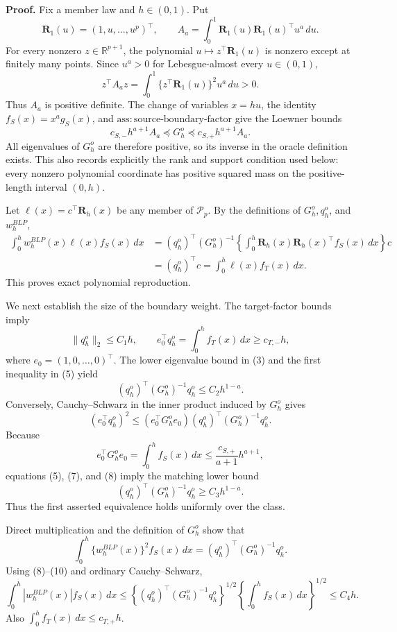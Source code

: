 \textbf{Proof.}
Fix a member law and \(h\in(0,1)\).  Put
\[
\mathbf R_1(u)=(1,u,\ldots,u^p)^\top,
\qquad
A_a=\int_0^1\mathbf R_1(u)\mathbf R_1(u)^\top u^a\,du.
\tag{1}
\]
For every nonzero \(z\in\mathbb R^{p+1}\), the polynomial
\(u\mapsto z^\top\mathbf R_1(u)\) is nonzero except at finitely many points.  Since
\(u^a>0\) for Lebesgue-almost every \(u\in(0,1)\),
\[
z^\top A_a z=\int_0^1\{z^\top\mathbf R_1(u)\}^2u^a\,du>0.
\tag{2}
\]
Thus \(A_a\) is positive definite.  The change of variables \(x=hu\), the identity
\(f_S(x)=x^ag_S(x)\), and \(\mathrm{ass:source\text{-}boundary\text{-}factor}\) give the Loewner bounds
\[
c_{S,-}h^{a+1}A_a
\preceq G_h^o
\preceq c_{S,+}h^{a+1}A_a.
\tag{3}
\]
All eigenvalues of \(G_h^o\) are therefore positive, so its inverse in the oracle definition exists.  This also records explicitly the rank and support condition used below: every nonzero polynomial coordinate has positive squared mass on the positive-length interval \((0,h)\).

Let \(\ell(x)=c^\top\mathbf R_h(x)\) be any member of \(\mathcal P_p\).  By the definitions of \(G_h^o,q_h^o\), and \(w_h^{BLP}\),
\[
\begin{aligned}
\int_0^h w_h^{BLP}(x)\ell(x)f_S(x)\,dx
&=(q_h^o)^\top(G_h^o)^{-1}
  \left\{\int_0^h\mathbf R_h(x)\mathbf R_h(x)^\top f_S(x)\,dx\right\}c\\
&=(q_h^o)^\top c
=\int_0^h\ell(x)f_T(x)\,dx.
\end{aligned}
\tag{4}
\]
This proves exact polynomial reproduction.

We next establish the size of the boundary weight.  The target-factor bounds imply
\[
\|q_h^o\|_2\le C_1h,
\qquad
e_0^\top q_h^o=\int_0^hf_T(x)\,dx\ge c_{T,-}h,
\tag{5}
\]
where \(e_0=(1,0,\ldots,0)^\top\).  The lower eigenvalue bound in (3) and the first inequality in (5) yield
\[
(q_h^o)^\top(G_h^o)^{-1}q_h^o\le C_2h^{1-a}.
\tag{6}
\]
Conversely, Cauchy--Schwarz in the inner product induced by \(G_h^o\) gives
\[
(e_0^\top q_h^o)^2
\le(e_0^\top G_h^oe_0)(q_h^o)^\top(G_h^o)^{-1}q_h^o.
\tag{7}
\]
Because
\[
e_0^\top G_h^oe_0=\int_0^hf_S(x)\,dx
\le \frac{c_{S,+}}{a+1}h^{a+1},
\tag{8}
\]
equations (5), (7), and (8) imply the matching lower bound
\[
(q_h^o)^\top(G_h^o)^{-1}q_h^o\ge C_3h^{1-a}.
\tag{9}
\]
Thus the first asserted equivalence holds uniformly over the class.

Direct multiplication and the definition of \(G_h^o\) show that
\[
\int_0^h\{w_h^{BLP}(x)\}^2f_S(x)\,dx
=(q_h^o)^\top(G_h^o)^{-1}q_h^o.
\tag{10}
\]
Using (8)--(10) and ordinary Cauchy--Schwarz,
\[
\int_0^h|w_h^{BLP}(x)|f_S(x)\,dx
\le
\left\{(q_h^o)^\top(G_h^o)^{-1}q_h^o\right\}^{1/2}
\left\{\int_0^hf_S(x)\,dx\right\}^{1/2}
\le C_4h.
\tag{11}
\]
Also \(\int_0^hf_T(x)\,dx\le c_{T,+}h\).

